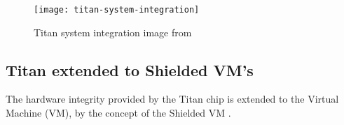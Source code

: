 \begin{figure}[!ht]
    \centering
    \texttt{[image: titan-system-integration]}
    \caption{Titan system integration image from \cite{yao_understanding_2021}}
    \label{fig:titan-system-integration}
\end{figure}


\subsection*{Titan extended to Shielded VM’s}
The hardware integrity provided by the Titan chip is extended 
to the Virtual Machine (VM), by the concept of the Shielded VM \citep{leibl_gcp_2022}.

